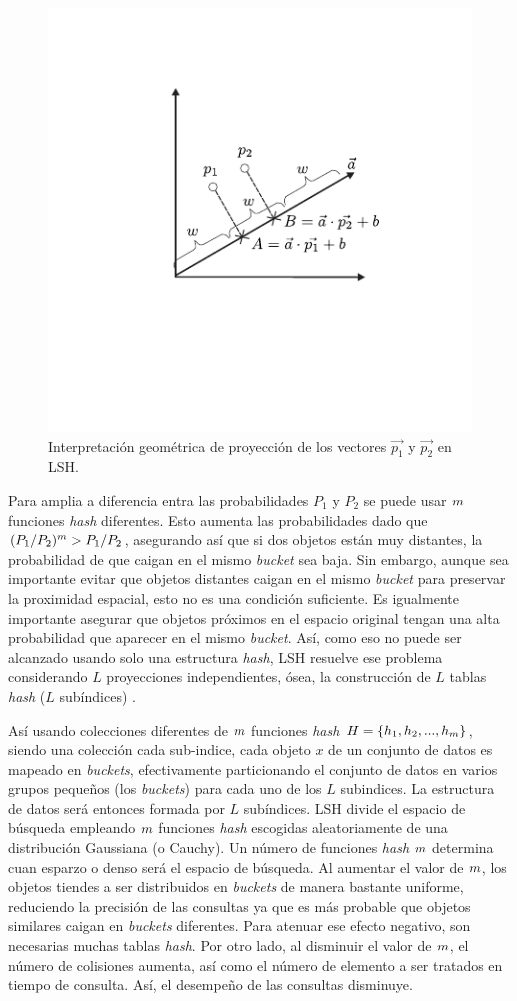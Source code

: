 \begin{figure}[htp]\centering
\includegraphics[width=0.3\columnwidth]{chapter2/lsh_projection.pdf}
\caption{Interpretación geométrica de proyección de los  vectores $\vec{p_1}$ y $\vec{p_2}$ en LSH.}
\label{fig:quantization}
\end{figure}

Para amplia a diferencia entra las probabilidades $P_1$ y $P_2$ se puede usar $m$ funciones \textit{hash} diferentes. Esto aumenta las probabilidades dado que \mbox{$(P_1/P_2)^m > P_1/P_2$}, asegurando así que si dos objetos están muy distantes, la probabilidad de que caigan en el mismo \textit{bucket} sea baja. Sin embargo, aunque sea importante evitar que objetos distantes caigan en el mismo \textit{bucket} para preservar la proximidad espacial, esto no es una condición suficiente. Es igualmente importante asegurar que objetos próximos en el espacio original tengan una alta probabilidad que aparecer en el mismo \textit{bucket}. Así, como eso no puede ser alcanzado usando solo una estructura \textit{hash}, LSH resuelve ese problema considerando $L$ proyecciones independientes, ósea, la construcción de $L$ tablas \textit{hash} ($L$ subíndices) \cite{lshtutorial,taoLSBLSH}.

Así usando colecciones diferentes de $m$ funciones \textit{hash} $H = \{h_1, h_2, ..., h_m\}$, siendo una colección cada sub-indice, cada objeto $x$ de un conjunto de datos es mapeado en \textit{buckets}, efectivamente particionando el conjunto de datos en varios grupos pequeños (los \textit{buckets}) para cada uno de los $L$ subindices. La estructura de datos será entonces formada por $L$ subíndices. LSH divide el espacio de búsqueda empleando $m$ funciones \textit{hash} escogidas aleatoriamente de una distribución Gaussiana (o Cauchy). Un número de funciones \textit{hash} $m$ determina cuan esparzo o denso será el espacio de búsqueda. Al aumentar el valor de $m$, los objetos tiendes a ser distribuidos en \textit{buckets} de manera bastante uniforme, reduciendo la precisión de las consultas ya que es más probable que objetos similares caigan en \textit{buckets} diferentes. Para atenuar ese efecto negativo, son necesarias muchas tablas \textit{hash}. Por otro lado, al disminuir el valor de $m$, el número de colisiones aumenta, así como el número de elemento a ser tratados en tiempo de consulta. Así, el desempeño de las consultas disminuye.



